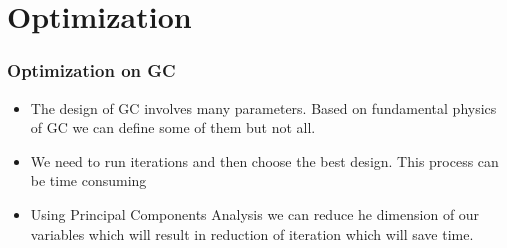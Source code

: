\documentclass{beamer}
\begin{document}
\section{Optimization} 
\begin{frame}
\frametitle{Optimization on GC}
\begin{itemize}
\item  The design of GC involves many parameters. Based on fundamental physics of GC we can define some of them but not all.
\item We need to run iterations and then choose the best design. This process can be time consuming
\item Using Principal Components Analysis we can reduce he dimension of our variables which will result in reduction of iteration which will save time.
\end{itemize}
\end{frame}
%
\end{document}
